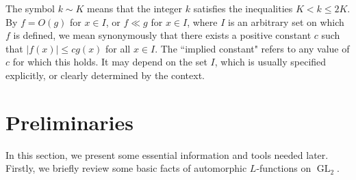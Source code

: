 \documentclass[11pt,reqno]{amsart}
\numberwithin{equation}{section}
\theoremstyle{plain}
\theoremstyle{definition}
\newcommand{\GL}{\operatorname{GL}}
\begin{document}
The symbol $k\sim K$ means that the integer $k$ satisfies the inequalities $K< k\le 2K$.
By $f = O(g)$ for $x\in I$, or $f \ll g$ for $x\in I$, where $I$ is an arbitrary set
on which $f$ is defined, we mean synonymously that there exists a positive constant $c$ such that $|f(x)| \leq cg(x)$ for all $x\in I$. The ``implied constant" refers to any value of $c$ for which this holds. It may depend on the set $I$, which is usually specified explicitly, or clearly determined by the context.
 
\section{Preliminaries}
In this section, we present some essential information and tools needed later. Firstly, we briefly
review some basic facts of automorphic $L$-functions on $\GL_2$.
\end{document}
